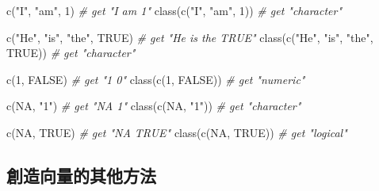 \documentclass[
]{book}
\newenvironment{Shaded}{\begin{snugshade}}{\end{snugshade}}
\newcommand{\CommentTok}[1]{\textcolor[rgb]{0.56,0.35,0.01}{\textit{#1}}}
\newcommand{\ConstantTok}[1]{\textcolor[rgb]{0.00,0.00,0.00}{#1}}
\newcommand{\DecValTok}[1]{\textcolor[rgb]{0.00,0.00,0.81}{#1}}
\newcommand{\FunctionTok}[1]{\textcolor[rgb]{0.00,0.00,0.00}{#1}}
\newcommand{\NormalTok}[1]{#1}
\newcommand{\StringTok}[1]{\textcolor[rgb]{0.31,0.60,0.02}{#1}}
\theoremstyle{definition}
\theoremstyle{remark}
\begin{document}
\begin{Shaded}
\begin{Highlighting}[]
\FunctionTok{c}\NormalTok{(}\StringTok{"I"}\NormalTok{, }\StringTok{"am"}\NormalTok{, }\DecValTok{1}\NormalTok{)  }\CommentTok{\# get "\textquotesingle{}I\textquotesingle{}  \textquotesingle{}am\textquotesingle{} \textquotesingle{}1\textquotesingle{}"}
\FunctionTok{class}\NormalTok{(}\FunctionTok{c}\NormalTok{(}\StringTok{"I"}\NormalTok{, }\StringTok{"am"}\NormalTok{, }\DecValTok{1}\NormalTok{))  }\CommentTok{\# get "\textquotesingle{}character\textquotesingle{}"}

\FunctionTok{c}\NormalTok{(}\StringTok{"He"}\NormalTok{, }\StringTok{"is"}\NormalTok{, }\StringTok{"the"}\NormalTok{, }\ConstantTok{TRUE}\NormalTok{)  }\CommentTok{\# get "\textquotesingle{}He\textquotesingle{}   \textquotesingle{}is\textquotesingle{}   \textquotesingle{}the\textquotesingle{}  \textquotesingle{}TRUE\textquotesingle{}"}
\FunctionTok{class}\NormalTok{(}\FunctionTok{c}\NormalTok{(}\StringTok{"He"}\NormalTok{, }\StringTok{"is"}\NormalTok{, }\StringTok{"the"}\NormalTok{, }\ConstantTok{TRUE}\NormalTok{))  }\CommentTok{\# get "\textquotesingle{}character\textquotesingle{}"}

\FunctionTok{c}\NormalTok{(}\DecValTok{1}\NormalTok{, }\ConstantTok{FALSE}\NormalTok{)  }\CommentTok{\# get "1 0"}
\FunctionTok{class}\NormalTok{(}\FunctionTok{c}\NormalTok{(}\DecValTok{1}\NormalTok{, }\ConstantTok{FALSE}\NormalTok{))  }\CommentTok{\# get "\textquotesingle{}numeric\textquotesingle{}"}

\FunctionTok{c}\NormalTok{(}\ConstantTok{NA}\NormalTok{, }\StringTok{"1"}\NormalTok{)  }\CommentTok{\# get "NA  \textquotesingle{}1\textquotesingle{}"}
\FunctionTok{class}\NormalTok{(}\FunctionTok{c}\NormalTok{(}\ConstantTok{NA}\NormalTok{, }\StringTok{"1"}\NormalTok{))  }\CommentTok{\# get "\textquotesingle{}character\textquotesingle{}"}

\FunctionTok{c}\NormalTok{(}\ConstantTok{NA}\NormalTok{, }\ConstantTok{TRUE}\NormalTok{)  }\CommentTok{\# get "NA  TRUE"}
\FunctionTok{class}\NormalTok{(}\FunctionTok{c}\NormalTok{(}\ConstantTok{NA}\NormalTok{, }\ConstantTok{TRUE}\NormalTok{))  }\CommentTok{\# get "\textquotesingle{}logical\textquotesingle{}"}
\end{Highlighting}
\end{Shaded}

\hypertarget{ux5275ux9020ux5411ux91cfux7684ux5176ux4ed6ux65b9ux6cd5}{%
\subsection{創造向量的其他方法}\label{ux5275ux9020ux5411ux91cfux7684ux5176ux4ed6ux65b9ux6cd5}}
\end{document}
